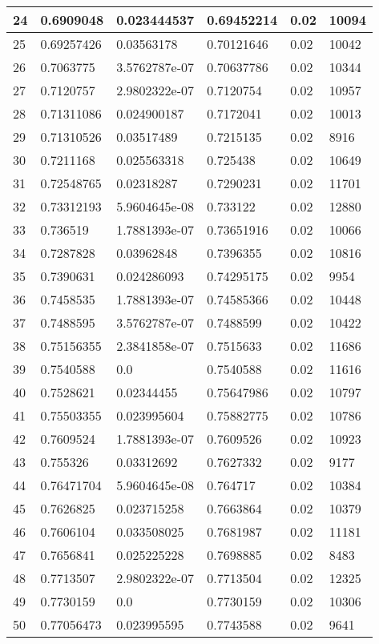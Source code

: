 \begin{longtable}{|l|l|l|l|l|l|}
24 & 0.6909048 & 0.023444537 & 0.69452214 & 0.02 & 10094 \\ \hline 
25 & 0.69257426 & 0.03563178 & 0.70121646 & 0.02 & 10042 \\ \hline 
26 & 0.7063775 & 3.5762787e-07 & 0.70637786 & 0.02 & 10344 \\ \hline 
27 & 0.7120757 & 2.9802322e-07 & 0.7120754 & 0.02 & 10957 \\ \hline 
28 & 0.71311086 & 0.024900187 & 0.7172041 & 0.02 & 10013 \\ \hline 
29 & 0.71310526 & 0.03517489 & 0.7215135 & 0.02 & 8916 \\ \hline 
30 & 0.7211168 & 0.025563318 & 0.725438 & 0.02 & 10649 \\ \hline 
31 & 0.72548765 & 0.02318287 & 0.7290231 & 0.02 & 11701 \\ \hline 
32 & 0.73312193 & 5.9604645e-08 & 0.733122 & 0.02 & 12880 \\ \hline 
33 & 0.736519 & 1.7881393e-07 & 0.73651916 & 0.02 & 10066 \\ \hline 
34 & 0.7287828 & 0.03962848 & 0.7396355 & 0.02 & 10816 \\ \hline 
35 & 0.7390631 & 0.024286093 & 0.74295175 & 0.02 & 9954 \\ \hline 
36 & 0.7458535 & 1.7881393e-07 & 0.74585366 & 0.02 & 10448 \\ \hline 
37 & 0.7488595 & 3.5762787e-07 & 0.7488599 & 0.02 & 10422 \\ \hline 
38 & 0.75156355 & 2.3841858e-07 & 0.7515633 & 0.02 & 11686 \\ \hline 
39 & 0.7540588 & 0.0 & 0.7540588 & 0.02 & 11616 \\ \hline 
40 & 0.7528621 & 0.02344455 & 0.75647986 & 0.02 & 10797 \\ \hline 
41 & 0.75503355 & 0.023995604 & 0.75882775 & 0.02 & 10786 \\ \hline 
42 & 0.7609524 & 1.7881393e-07 & 0.7609526 & 0.02 & 10923 \\ \hline 
43 & 0.755326 & 0.03312692 & 0.7627332 & 0.02 & 9177 \\ \hline 
44 & 0.76471704 & 5.9604645e-08 & 0.764717 & 0.02 & 10384 \\ \hline 
45 & 0.7626825 & 0.023715258 & 0.7663864 & 0.02 & 10379 \\ \hline 
46 & 0.7606104 & 0.033508025 & 0.7681987 & 0.02 & 11181 \\ \hline 
47 & 0.7656841 & 0.025225228 & 0.7698885 & 0.02 & 8483 \\ \hline 
48 & 0.7713507 & 2.9802322e-07 & 0.7713504 & 0.02 & 12325 \\ \hline 
49 & 0.7730159 & 0.0 & 0.7730159 & 0.02 & 10306 \\ \hline 
50 & 0.77056473 & 0.023995595 & 0.7743588 & 0.02 & 9641 \\ \hline 
\end{longtable}